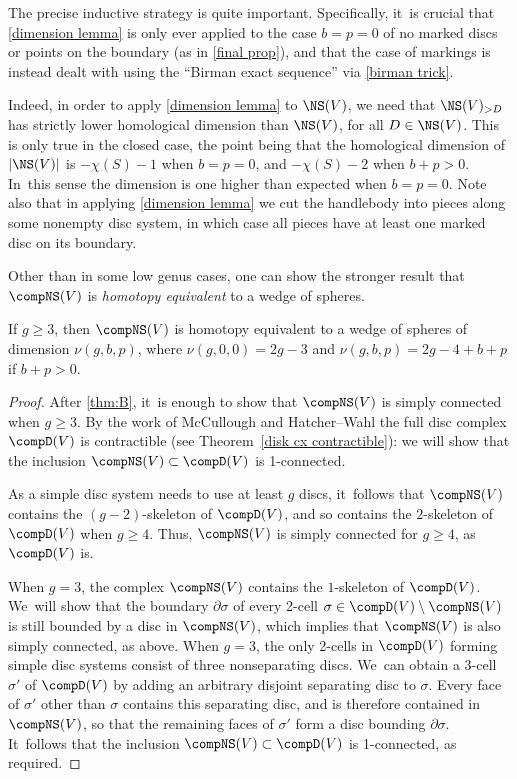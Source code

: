 \begin{rem}The precise inductive strategy is quite important. Specifically, it~is crucial that \cref{dimension lemma} is only ever applied to the case $b=p=0$ of no marked discs or points on the boundary (as in \cref{final prop}), and that the case of markings is instead dealt with using the ``Birman exact sequence'' via \cref{birman trick}.

Indeed, in order to apply \cref{dimension lemma} to $\NS(V)$, we need that $\NS(V)_{>D}$ has strictly lower homological dimension than $\NS(V)$, for all $D \in \NS(V)$. This is only true in the closed case, the point being that the homological dimension of $|\NS(V)|$ is $-\chi(S)-1$ when $b=p=0$, and $-\chi(S)-2$ when $b+p>0$. In~this sense the dimension is one higher than expected when $b=p=0$.
Note also that in applying \cref{dimension lemma} we cut the handlebody into pieces along some nonempty disc system, in which case all pieces have at least one marked disc on its boundary.
\end{rem}

Other than in some low genus cases, one can show the stronger result that $\compNS(V)$ is \emph{homotopy equivalent} to a wedge of spheres.

\begin{prop} \label{prop: simple connectivity}
If $g \geq 3$, then $\compNS(V)$ is homotopy equivalent to a wedge of spheres of dimension $\nu(g,b,p)$, where $\nu(g,0,0) = 2g-3$ and $\nu(g,b,p) = 2g-4+b+p$ if $b+p>0$.
\end{prop}

\begin{proof}
After \cref{thm:B}, it~is enough to show that $\compNS(V)$ is simply connected when $g \geq 3$. By the work of McCullough \cite{mccullough} and Hatcher--Wahl \cite{hatcherwahl} the full disc complex $\compD(V)$ is contractible (see Theorem~\ref{disk cx contractible}): we will show that the inclusion $\compNS(V) \subset \compD(V)$ is 1-connected.

As a simple disc system needs to use at least $g$ discs, it~follows that $\compNS(V)$ contains the $(g-2)$-skeleton of $\compD(V)$, and so contains the $2$-skeleton of $\compD(V)$ when $g \geq 4$. Thus, $\compNS(V)$ is simply connected for $g \geq 4$, as $\compD(V)$ is.

When $g=3$, the complex $\compNS(V)$ contains the $1$-skeleton of $\compD(V)$. We~will show that the boundary $\partial \sigma$ of every 2-cell $\sigma \in \compD(V) \setminus \compNS(V)$ is still bounded by a disc in $\compNS(V)$, which implies that $\compNS(V)$ is also simply connected, as above. When $g=3$, the only 2-cells in $\compD(V)$ forming simple disc systems consist of three nonseparating discs. We~can obtain a 3-cell $\sigma'$ of $\compD(V)$ by adding an arbitrary disjoint separating disc to $\sigma$. Every face of $\sigma'$ other than $\sigma$ contains this separating disc, and is therefore contained in $\compNS(V)$, so that the remaining faces of $\sigma'$ form a disc bounding $\partial \sigma$. It~follows that the inclusion $\compNS(V) \subset \compD(V)$ is 1-connected, as required.
\end{proof}

